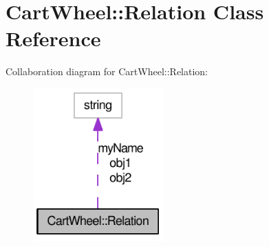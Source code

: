 \hypertarget{classCartWheel_1_1Relation}{
\section{CartWheel::Relation Class Reference}
\label{classCartWheel_1_1Relation}
}


Collaboration diagram for CartWheel::Relation:\nopagebreak
\begin{figure}[H]
\begin{center}
\leavevmode
\includegraphics[width=142pt]{classCartWheel_1_1Relation__coll__graph}
\end{center}
\end{figure}
